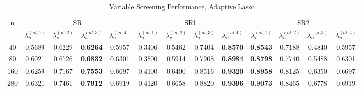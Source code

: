 \documentclass[12pt,a4paper]{article}
\begin{document}
\begin{landscape}
\begin{table}[]\center
\caption{Variable Screening Performance, Adaptive Lasso}
\label{tab:2}
\begin{tabular}{ccccccccccccc}
\hline
\multicolumn{1}{|c|}{\multirow{2}{*}{n}} & \multicolumn{4}{c|}{SR}                                                                                                    & \multicolumn{4}{c|}{SR1}                                                                                                   & \multicolumn{4}{c|}{SR2}                                                                                                   \\
\multicolumn{1}{|c|}{}                   & $ \lambda_n^{(al, 1)} $ & $ \lambda_n^{(al, 2)} $ & $ \lambda_n^{(al, 3)} $ & \multicolumn{1}{c|}{$ \lambda_n^{(al, 4)} $} & $ \lambda_n^{(al, 1)} $ & $ \lambda_n^{(al, 2)} $ & $ \lambda_n^{(al, 3)} $ & \multicolumn{1}{c|}{$ \lambda_n^{(al, 4)} $} & $ \lambda_n^{(al, 1)} $ & $ \lambda_n^{(al, 2)} $ & $ \lambda_n^{(al, 3)} $ & \multicolumn{1}{c|}{$ \lambda_n^{(al, 4)} $} \\ \hline
\multicolumn{1}{|c|}{40}                 & 0.5689                  & 0.6229                  & \textbf{0.6264}         & \multicolumn{1}{c|}{0.5957}                  & 0.3406                  & 0.5462                  & 0.7404                  & \multicolumn{1}{c|}{\textbf{0.8570}}         & \textbf{0.8543}         & 0.7188                  & 0.4840                  & \multicolumn{1}{c|}{0.5957}                  \\
\multicolumn{1}{|c|}{80}                 & 0.6021                  & 0.6726                  & \textbf{0.6832}         & \multicolumn{1}{c|}{0.6301}                  & 0.3800                  & 0.5914                  & 0.7908                  & \multicolumn{1}{c|}{\textbf{0.8984}}         & \textbf{0.8798}         & 0.7740                  & 0.5488                  & \multicolumn{1}{c|}{0.6301}                  \\
\multicolumn{1}{|c|}{160}                & 0.6259                  & 0.7167                  & \textbf{0.7553}         & \multicolumn{1}{c|}{0.6697}                  & 0.4100                  & 0.6400                  & 0.8516                  & \multicolumn{1}{c|}{\textbf{0.9320}}         & \textbf{0.8958}         & 0.8125                  & 0.6350                  & \multicolumn{1}{c|}{0.6697}                  \\
\multicolumn{1}{|c|}{280}                & 0.6321                  & 0.7461                  & \textbf{0.7912}         & \multicolumn{1}{c|}{0.6919}                  & 0.4120                  & 0.6658                  & 0.8820                  & \multicolumn{1}{c|}{\textbf{0.9396}}         & \textbf{0.9073}         & 0.8465                  & 0.6778                  & \multicolumn{1}{c|}{0.6919}                  \\

\end{tabular}
\end{table}
\end{landscape}
\end{document}
